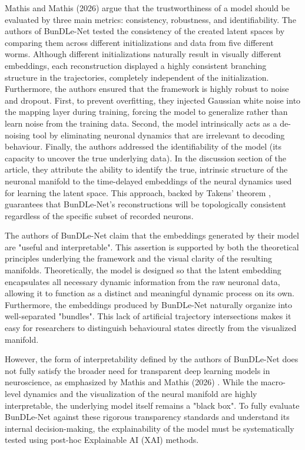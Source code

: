 \documentclass{article}
\begin{document}
Mathis and Mathis (2026) \cite{mathis2026joint} argue that the trustworthiness of a model should be evaluated by three main metrics: consistency, robustness, and identifiability. The authors of BunDLe-Net tested the consistency of the created latent spaces by comparing them across different initializations and data from five different worms. Although different initializations naturally result in visually different embeddings, each reconstruction displayed a highly consistent branching structure in the trajectories, completely independent of the initialization. Furthermore, the authors ensured that the framework is highly robust to noise and dropout. First, to prevent overfitting, they injected Gaussian white noise into the mapping layer during training, forcing the model to generalize rather than learn noise from the training data. Second, the model intrinsically acts as a de-noising tool by eliminating neuronal dynamics that are irrelevant to decoding behaviour. Finally, the authors addressed the identifiability of the model (its capacity to uncover the true underlying data). In the discussion section of the article, they attribute the ability to identify the true, intrinsic structure of the neuronal manifold to the time-delayed embeddings of the neural dynamics used for learning the latent space. This approach, backed by Takens' theorem \cite{takens2006detecting}, guarantees that BunDLe-Net's reconstructions will be topologically consistent regardless of the specific subset of recorded neurons.

The authors of BunDLe-Net claim that the embeddings generated by their model are "useful and interpretable". This assertion is supported by both the theoretical principles underlying the framework and the visual clarity of the resulting manifolds. Theoretically, the model is designed so that the latent embedding encapsulates all necessary dynamic information from the raw neuronal data, allowing it to function as a distinct and meaningful dynamic process on its own. Furthermore, the embeddings produced by BunDLe-Net naturally organize into well-separated "bundles". This lack of artificial trajectory intersections makes it easy for researchers to distinguish behavioural states directly from the visualized manifold. 

However, the form of interpretability defined by the authors of BunDLe-Net does not fully satisfy the broader need for transparent deep learning models in neuroscience, as emphasized by Mathis and Mathis (2026) \cite{mathis2026joint}. While the macro-level dynamics and the visualization of the neural manifold are highly interpretable, the underlying model itself remains a "black box". To fully evaluate BunDLe-Net against these rigorous transparency standards and understand its internal decision-making, the explainability of the model must be systematically tested using post-hoc Explainable AI (XAI) methods.
\end{document}
